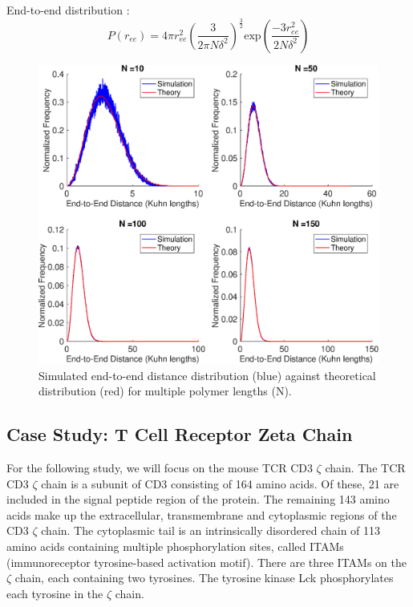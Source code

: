 \documentclass[../AdvancementSummary.tex]{subfiles}
\begin{document}
End-to-end distribution \cite{VanValen2009, Reeves2011}:
\begin{equation*}
P(r_{ee}) = 4\pi r_{ee}^2 \left( \frac{3}{2\pi N \delta^2}\right)^{\frac{3}{2}}\text{exp}\left(\frac{-3r_{ee}^2}{2N \delta^2}\right)
\end{equation*}

\begin{figure}[H]
\begin{center}
\includegraphics[width=0.8\linewidth]{ModelConfirmationFigures/ReeDistribution.eps}
\caption{Simulated end-to-end distance distribution (blue) against theoretical distribution (red) for multiple polymer lengths (N). \label{fig: ReeDist}}
\end{center}
\end{figure}


\subsection{Case Study: T Cell Receptor Zeta Chain}
\label{sec:ModelDevsubsec:TCR}
For the following study, we will focus on the mouse TCR CD3 $\zeta$ chain. The TCR CD3 $\zeta$ chain is a subunit of CD3 consisting of 164 amino acids. Of these, 21 are included in the signal peptide region of the protein. The remaining 143 amino acids make up the extracellular, transmembrane and cytoplasmic regions of the CD3 $\zeta$ chain. The cytoplasmic tail is an intrinsically disordered chain of 113 amino acids containing multiple phosphorylation sites, called ITAMs (immunoreceptor tyrosine-based activation motif). There are three ITAMs on the $\zeta$ chain, each containing two tyrosines. The tyrosine kinase Lck phosphorylates each tyrosine in the $\zeta$ chain. 
\end{document}
